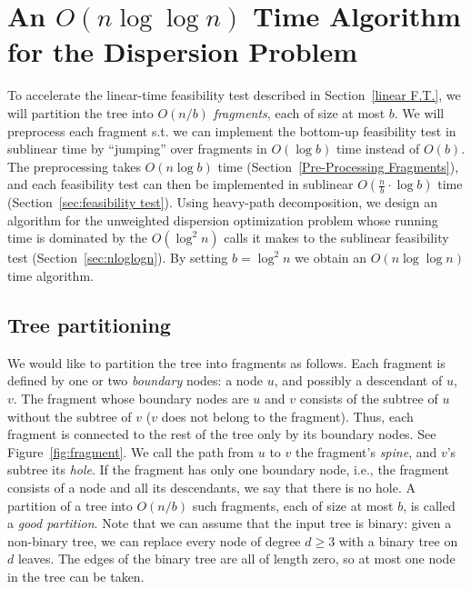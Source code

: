 \documentclass[11pt,a4paper]{article}
\theoremstyle{definition}
\theoremstyle{remark}
\begin{document}
\section{An \texorpdfstring{\boldmath$O(n\log\log n)$}{O(nloglogn)} Time Algorithm for the Dispersion Problem}
\label{sublinear f.t.}

To accelerate the linear-time feasibility test described in Section~\ref{linear F.T.}, we will partition the tree into $O(n/b)$ {\em fragments}, each of size at most
$b$. We will preprocess each fragment s.t. we can implement the bottom-up feasibility test in sublinear time by  ``jumping'' over fragments in $O(\log b)$ time instead of $O(b)$.  The preprocessing takes $O(n\log b)$ time (Section~\ref{Pre-Processing Fragments}), and each feasibility test can then be implemented in sublinear $O(\frac{n}{b} \cdot \log b)$ time (Section~\ref{sec:feasibility test}). Using heavy-path decomposition, we design an algorithm for the unweighted dispersion optimization problem whose running time is dominated by the $O(\log^{2}n)$ calls it makes to the sublinear feasibility test  (Section~\ref{sec:nloglogn}). By setting $b=\log^{2}n$ we obtain an $O(n\log\log n)$ time algorithm.

\subsection{Tree partitioning}
We would like to partition the tree into fragments as follows. Each fragment is defined by one or two {\em boundary} nodes: a node $u$, and possibly a descendant of $u$, $v$. The fragment whose boundary nodes are $u$ and $v$ consists of the subtree of $u$ without the subtree of $v$ ($v$ does not belong to the fragment). Thus, each fragment is connected to the rest of the tree only by its boundary nodes. See Figure~\ref{fig:fragment}. 
We call the path from $u$ to $v$ the fragment's \textit{spine}, and $v$'s subtree its \textit{hole}. If the
fragment has only one boundary node, i.e., the fragment consists of a node and all its descendants, we say that there is no hole.
A partition of a tree into $O(n/b)$ such fragments, each of size at most $b$, is called a \emph{good partition}.
Note that we can assume that the input tree is binary: given a non-binary tree, we can replace every node of degree $d\geq 3$ with a binary tree on
$d$ leaves. The edges of the binary tree are all of length zero, so at most one node in the tree can be taken.
\end{document}
